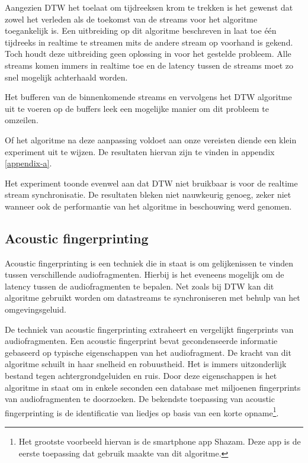 Aangezien DTW het toelaat om tijdreeksen krom te trekken is het gewenst dat zowel het verleden als de toekomst van de streams voor het algoritme toegankelijk is. Een uitbreiding op dit algoritme beschreven in \cite{dixon2005live} laat toe één tijdreeks in realtime te streamen mits de andere stream op voorhand is gekend. Toch houdt deze uitbreiding geen oplossing in voor het gestelde probleem. Alle streams komen immers in realtime toe en de latency tussen de streams moet zo snel mogelijk achterhaald worden.

Het bufferen van de binnenkomende streams en vervolgens het DTW algoritme uit te voeren op de buffers leek een mogelijke manier om dit probleem te omzeilen.

Of het algoritme na deze aanpassing voldoet aan onze vereisten diende een klein experiment uit te wijzen. De resultaten hiervan zijn te vinden in appendix \ref{appendix-a}.

Het experiment toonde evenwel aan dat DTW niet bruikbaar is voor de realtime stream synchronisatie. De resultaten bleken niet nauwkeurig genoeg, zeker niet wanneer ook de performantie van het algoritme in beschouwing werd genomen.

\subsection{Acoustic fingerprinting}

Acoustic fingerprinting is een techniek die in staat is om gelijkenissen te vinden tussen verschillende audiofragmenten. Hierbij is het eveneens mogelijk om de latency tussen de audiofragmenten te bepalen. Net zoals bij DTW kan dit algoritme gebruikt worden om datastreams te synchroniseren met behulp van het omgevingsgeluid.

De techniek van acoustic fingerprinting extraheert en vergelijkt fingerprints van audiofragmenten. Een acoustic fingerprint bevat gecondenseerde informatie gebaseerd op typische eigenschappen van het audiofragment. De kracht van dit algoritme schuilt in haar snelheid en robuustheid. Het is immers uitzonderlijk bestand tegen achtergrondgeluiden en ruis. Door deze eigenschappen is het algoritme in staat om in enkele seconden een database met miljoenen fingerprints van audiofragmenten te doorzoeken. De bekendste toepassing van acoustic fingerprinting is de identificatie van liedjes op basis van een korte opname\footnote{Het grootste voorbeeld hiervan is de smartphone app Shazam. Deze app is de eerste toepassing dat gebruik maakte van dit algoritme.}.

